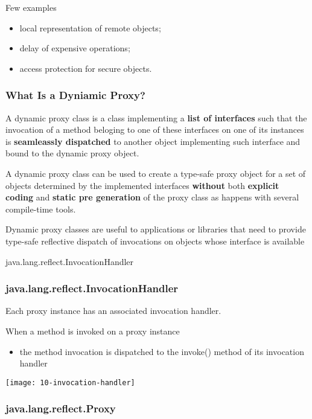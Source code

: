 Few examples

\begin{itemize}
	\item local representation of remote objects;
	\item delay of expensive operations;
	\item access protection for secure objects.
\end{itemize}

\subsubsection{What Is a Dyniamic Proxy?}

A dynamic proxy class is a class implementing a \textbf{list of interfaces} such that the invocation of a method beloging to one of these interfaces on one of its instances is \textbf{seamleassly dispatched} to another object implementing such interface and bound to the dynamic proxy object.

A dynamic proxy class can be used to create a type-safe proxy object for a set of objects determined by the implemented interfaces \textbf{without} both \textbf{explicit coding} and \textbf{static pre generation} of the proxy class as happens with several compile-time tools.

Dynamic proxy classes are useful to applications or libraries that need to provide type-safe reflective dispatch of invocations on objects whose interface is available

java.lang.reflect.InvocationHandler

\subsubsection{java.lang.reflect.InvocationHandler}

Each proxy instance has an associated invocation handler.

When a method is invoked on a proxy instance

\begin{itemize}
	\item the method invocation is dispatched to the invoke() method of its invocation handler
\end{itemize}

\begin{center}
\texttt{[image: 10-invocation-handler]}
\end{center}

\subsubsection{java.lang.reflect.Proxy}

